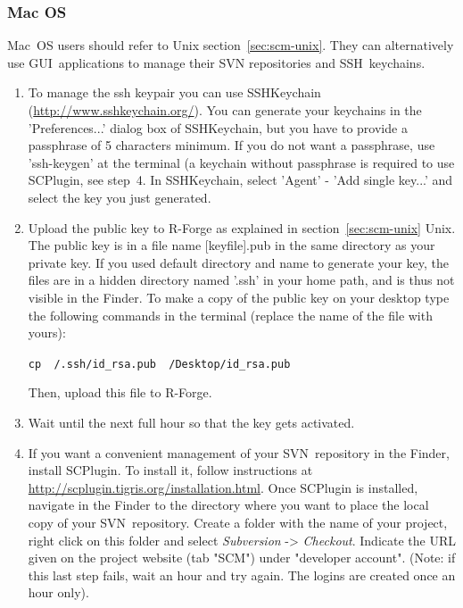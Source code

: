 \documentclass[a4paper]{article}
\let\code=\texttt
\newcommand{\proglang}[1]{\textsf{#1}}
\begin{document}
\subsubsection{Mac OS}
\label{sec:scm-macosx}
Mac~OS users should refer to Unix section~\ref{sec:scm-unix}. They
can alternatively use GUI~applications to manage their SVN
repositories and SSH~keychains.

\begin{enumerate}
\item To manage the ssh keypair you can use SSHKeychain
(\url{http://www.sshkeychain.org/}). You can generate your keychains
in the 'Preferences...' dialog box of SSHKeychain, but you have to provide a
passphrase of 5 characters minimum. If you do not want a passphrase,
use 'ssh-keygen' at the terminal (a keychain without passphrase is
required to use SCPlugin, see step~4. In SSHKeychain, select 'Agent'
- 'Add single key...' and select the key you just generated. 

\item Upload the public key to \proglang{R}-Forge as explained in
  section~\ref{sec:scm-unix}
  Unix. The public key is in a file name [keyfile].pub in the same
  directory as your private key. If you used default directory and
  name to generate your key, the files are in a hidden directory named
  '.ssh' in your home path, and is thus not visible in the Finder. To
  make a copy of the public key on your desktop type the following
  commands in the terminal (replace the name of the file with yours): 

  \code{cp ~/.ssh/id\_rsa.pub ~/Desktop/id\_rsa.pub}
  
  Then, upload this file to \proglang{R}-Forge.

\item Wait until the next full hour so that the key gets activated.

\item If you want a convenient management of your SVN~repository in the
  Finder, install SCPlugin. To install it, follow instructions at
  \url{http://scplugin.tigris.org/installation.html}. Once SCPlugin is
  installed, navigate in the Finder to the directory where you want to
  place the local copy of your SVN~repository. Create a folder with the name
  of your project, right click on this folder and select \textit{Subversion}
  -> \textit{Checkout}. Indicate the URL given on the project website (tab
  "SCM") under "developer account". (Note: if this last step fails,
  wait an hour and try again. The logins are created once an hour
  only). 

\end{enumerate}
\end{document}
